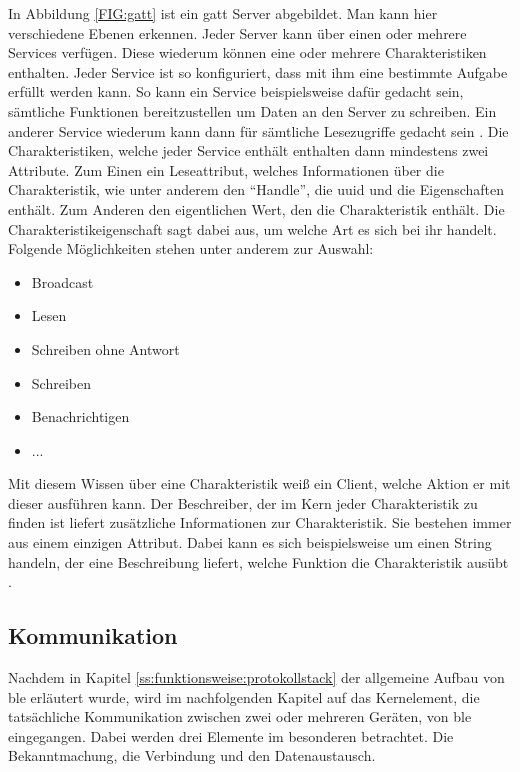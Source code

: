 \noindent In Abbildung \ref{FIG:gatt} ist ein \ac{gatt} Server abgebildet. Man kann hier verschiedene Ebenen erkennen. Jeder Server kann über einen oder mehrere Services verfügen. Diese wiederum können eine oder mehrere Charakteristiken enthalten. Jeder Service ist so konfiguriert, dass mit ihm eine bestimmte Aufgabe erfüllt werden kann. So kann ein Service beispielsweise dafür gedacht sein, sämtliche Funktionen bereitzustellen um Daten an den Server zu schreiben. Ein anderer Service wiederum kann dann für sämtliche Lesezugriffe gedacht sein \cite[Seite 32]{Usama17:BBS}. Die Charakteristiken, welche jeder Service enthält enthalten dann mindestens zwei Attribute. Zum Einen ein Leseattribut, welches Informationen über die Charakteristik, wie unter anderem den "`Handle"', die \ac{uuid} und die Eigenschaften enthält. Zum Anderen den eigentlichen Wert, den die Charakteristik enthält. Die Charakteristikeigenschaft sagt dabei aus, um welche Art es sich bei ihr handelt. Folgende Möglichkeiten stehen unter anderem zur Auswahl: 
\begin{itemize}
	\item{Broadcast}
	\item{Lesen}
	\item{Schreiben ohne Antwort}
	\item{Schreiben}
	\item{Benachrichtigen}
	\item{...}
\end{itemize} 
Mit diesem Wissen über eine Charakteristik weiß ein Client, welche Aktion er mit dieser ausführen kann. Der Beschreiber, der im Kern jeder Charakteristik zu finden ist liefert zusätzliche Informationen zur Charakteristik. Sie bestehen immer aus einem einzigen Attribut. Dabei kann es sich beispielsweise um einen String handeln, der eine Beschreibung liefert, welche Funktion die Charakteristik ausübt \cite[Seite 59ff]{Townsend14:GSB}.\\ 

\subsection{Kommunikation}
\label{ss:funktionsweise:kommunkation}

Nachdem in Kapitel \ref{ss:funktionsweise:protokollstack} der allgemeine Aufbau von \ac{ble} erläutert wurde, wird im nachfolgenden Kapitel auf das Kernelement, die tatsächliche Kommunikation zwischen zwei oder mehreren Geräten, von \ac{ble} eingegangen. Dabei werden drei Elemente im besonderen betrachtet. Die Bekanntmachung, die Verbindung und den Datenaustausch.\\

